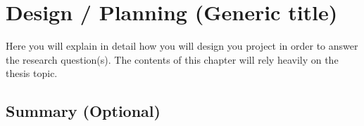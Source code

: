 \cleardoublepage
\chapter{Design / Planning (Generic title)}
\label{chap:design} 

Here you will explain in detail how you will design you project in order to answer the research question(s). The contents of this chapter will rely heavily on the thesis topic.

 
\lipsum[22-33]
 
\section{Summary (Optional)}






